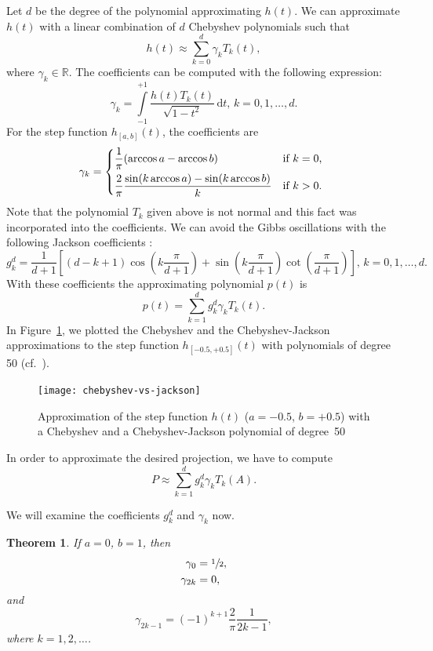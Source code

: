 \documentclass[%
	paper=a4,
	fontsize=10pt,
	DIV11,BCOR10mm,
	numbers=noenddot,
	abstract=yes
]{scrartcl}
\newcommand{\R}{\mathbb{R}}
\newtheorem{theorem}{Theorem}[section]
\theoremstyle{definition}
\begin{document}
Let $d$ be the degree of the polynomial approximating $h(t)$. We can approximate
$h(t)$ with a linear combination of $d$ Chebyshev polynomials such that
\[ h(t) \approx \sum_{k=0}^d \gamma_k T_k(t), \]
where $\gamma_k \in \R$. The coefficients can be computed with the following
expression:
\[
	\gamma_k =
	\int\limits_{-1}^{+1} \frac{h(t) T_k(t)}{\sqrt{1 - t^2}}\,\mathrm{d}t,
	\, k = 0, 1, \dotsc, d.
\]
For the step function $h_{[a,b]}(t)$, the coefficients are \cite{DiNapoli2016}
\[
	\gamma_k =
	\begin{dcases*}
		\frac{1}{\pi} (\arccos a - \arccos b) & if $k = 0$, \\
		\frac{2}{\pi} \frac{\sin(k \arccos a) - \sin(k \arccos b)}{k} &
			if $k > 0$.
	\end{dcases*}
\]
Note that the polynomial $T_k$ given above is not normal and this fact was
incorporated into the coefficients. We can avoid the Gibbs oscillations with the
following Jackson coefficients \cite[§II.C.3]{Weisse2006}:
\begin{equation}
\label{eq:jackson-coefficients}
	g_k^d =
	\frac{1}{d+1}
	\left[
		(d - k + 1) \cos\left(k \frac{\pi}{d+1}\right) +
		\sin\left(k \frac{\pi}{d+1}\right) \cot\left(\frac{\pi}{d+1}\right)
	\right], \, k = 0, 1, \dotsc, d.
\end{equation}
With these coefficients the approximating polynomial $p(t)$ is
\[ p(t) = \sum_{k=1}^d g_k^d \gamma_k T_k(t). \]
In Figure~\ref{fig:chebyshev-vs-jackson}, we plotted the Chebyshev and the
Chebyshev-Jackson approximations to the step function $h_{[-0.5,+0.5]}(t)$ with
polynomials of degree 50 (cf.~\cite[Fig.~1]{DiNapoli2016}).

\begin{figure}
	\centering
	\texttt{[image: chebyshev-vs-jackson]}
	\caption{Approximation of the step function $h(t)$ ($a = -0.5$, $b =
		+0.5$) with a Chebyshev and a Chebyshev-Jackson polynomial of
	degree~50}
	\label{fig:chebyshev-vs-jackson}
\end{figure}

In order to approximate the desired projection, we have to compute
\[ P \approx \sum_{k=1}^d g_k^d \gamma_k T_k(A). \]

We will examine the coefficients $g_k^d$ and $\gamma_k$ now.

\begin{theorem}
	\label{thm:chebyshev-heaviside-coefficients}
	If $a = 0$, $b = 1$, then
	\begin{align*}
		\gamma_0 &= \sfrac{1}{2}, \\
		\gamma_{2k} &= 0,
	\end{align*}
	and
	\[
		\gamma_{2k-1} = (-1)^{k+1} \frac{2}{\pi} \frac{1}{2k - 1},
	\]
	where $k = 1, 2, \dotso$.
\end{theorem}
\end{document}
